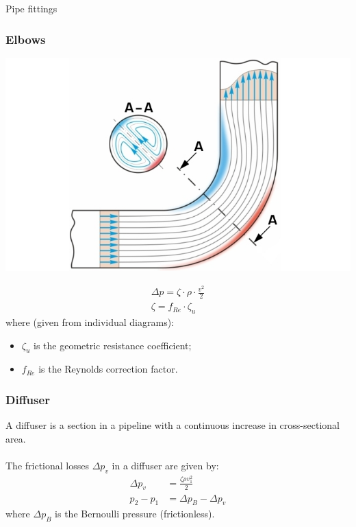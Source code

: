 \documentclass{article}
\begin{document}
\begin{multicols}{2}
\begin{theorybox}{Pipe fittings}
    \subsubsection{Elbows}
    \begin{center}
        \includegraphics[width=.8\textwidth]{media/Sekundärströmung-Rohrkrümmer.jpg}
    \end{center}
    \begin{align}
        \Delta p = \zeta \cdot \rho \cdot\frac{v^2}{2}\\
        \zeta = f_{Re} \cdot \zeta_u
    \end{align}
    where (given from individual diagrams):
    \begin{itemize}
        \item $\zeta_u$ is the geometric resistance coefficient;
        \item $f_{Re}$ is the Reynolds correction factor.
    \end{itemize}
    
    \subsubsection{Diffuser}
    A diffuser is a section in a pipeline with a continuous increase in cross-sectional area.\\\\
    The frictional losses $\Delta p_v$ in a diffuser are given by:
    \begin{align}
        \Delta p_v &= \frac{\zeta\rho v_1^2}{2}\\
        p_2 - p_1 &= \Delta p_B - \Delta p_v
    \end{align}
    where $\Delta p_B$ is the Bernoulli pressure (frictionless).
\end{theorybox}
\vfill
\phantom{}
\end{multicols}
\end{document}
